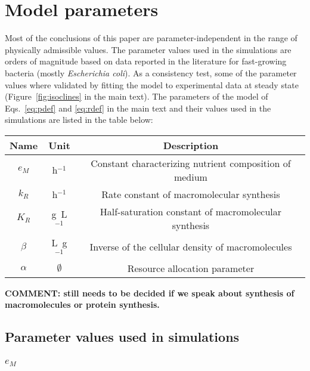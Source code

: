 \section{Model parameters}
\label{sec:supp_S2}


Most of the conclusions of this paper are parameter-independent in the range of physically admissible values.
The parameter values used in the simulations are orders of magnitude based on data reported in the literature for fast-growing bacteria (mostly \textit{Escherichia coli}).
As a consistency test, some of the parameter values where validated by fitting the model to experimental data at steady state (Figure~\ref{fig:isoclines} in the main text).
The parameters of the model of Eqs.~\ref{eq:pdef} and \ref{eq:rdef} in the main text and their values used in the simulations are listed in the table below:

\begin{center}
\begin{tabular}{|c|c|c|}
\hline
Name & Unit & Description \\
\hline
$e_M$ & h$^{-1}$ & Constant characterizing nutrient composition of medium\\
\hline
$k_R$ & h$^{-1}$ & Rate constant of macromolecular synthesis\\
\hline
$K_R$ & g\ L$^{-1}$ & Half-saturation constant of macromolecular synthesis\\
\hline
$\beta$ & L\ g$^{-1}$ & Inverse of the cellular density of macromolecules\\ %
\hline
$\alpha$ & $\emptyset$ & Resource allocation parameter\\
\hline
\end{tabular}
\end{center}

\textbf{COMMENT: still needs to be decided if we speak about synthesis of macromolecules or protein synthesis. }

\subsection{Parameter values used in simulations}

\subsubsection{\texorpdfstring{$e_M$}{eM}}

